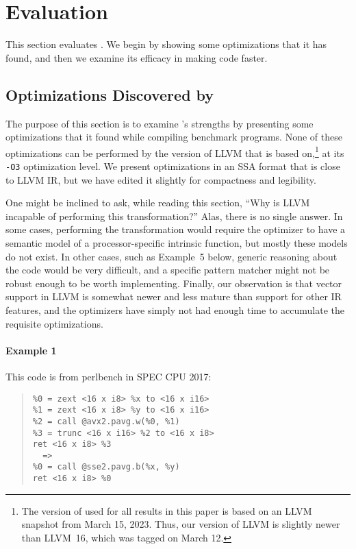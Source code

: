 \section{Evaluation}
\label{sec:evaluation}

This section evaluates \tool{}.
%
We begin by showing some optimizations that it has found, and then we
examine its efficacy in making code faster.



\subsection{Optimizations Discovered by \tool}

The purpose of this section is to examine \tool's strengths by
presenting some optimizations that it found while compiling benchmark
programs.
%
None of these optimizations can be performed by the version of LLVM
that \tool{} is based on,\footnote{The version of \tool{} used for all
results in this paper is based on an LLVM snapshot from March 15,
2023. Thus, our version of LLVM is slightly newer than LLVM~16, which
was tagged on March 12.} at its \texttt{-O3} optimization level.
%
We present optimizations in an SSA format that is close to LLVM IR,
but we have edited it slightly for compactness and legibility.


One might be inclined to ask, while reading this section, ``Why is
LLVM incapable of performing this transformation?''
%
Alas, there is no single answer.
%
In some cases, performing the transformation would require the
optimizer to have a semantic model of a processor-specific intrinsic
function, but mostly these models do not exist.
%
In other cases, such as Example~5 below, generic reasoning about the
code would be very difficult, and a specific pattern matcher might not
be robust enough to be worth implementing.
%
Finally, our observation is that vector support in LLVM is somewhat
newer and less mature than support for other IR features, and the
optimizers have simply not had enough time to accumulate the requisite
optimizations.


\paragraph{Example 1}

This code is from perlbench in SPEC CPU 2017:

{\small\begin{quote}\begin{verbatim}
%0 = zext <16 x i8> %x to <16 x i16>
%1 = zext <16 x i8> %y to <16 x i16>
%2 = call @avx2.pavg.w(%0, %1)
%3 = trunc <16 x i16> %2 to <16 x i8>
ret <16 x i8> %3
  =>
%0 = call @sse2.pavg.b(%x, %y)
ret <16 x i8> %0
\end{verbatim}
\end{quote}}

